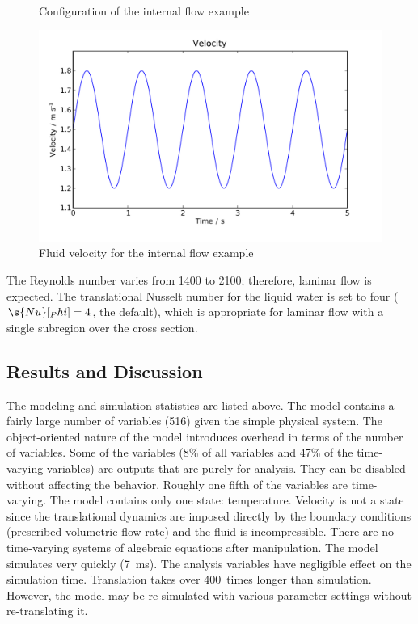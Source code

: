 \begin{figure}[htbp]
  \\
  \caption{Configuration of the internal flow example}
  \label{fig:InternalFlow}
\end{figure}

\begin{figure}[htbp]
  \includegraphics[width=\linewidth]{Results/Basic/InternalFlow/1/Velocity}%
  \caption{Fluid velocity for the internal flow example}%
  \label{fig:InternalFlowRate}
\end{figure}

The Reynolds number varies from 1400 to 2100; therefore, laminar flow is expected.  The translational Nusselt number for the liquid water is set to four ($\s{Nu}[_Phi] = 4$, the default), which is appropriate for laminar flow with a single subregion over the cross section.

\subsection{Results and Discussion}



The modeling and simulation statistics are listed above.  The model contains a fairly large number of variables (516) given the simple physical system.  The object-oriented nature of the model introduces overhead in terms of the number of variables.  Some of the variables (8\% of all variables and 47\% of the time-varying variables) are outputs that are purely for analysis.  They can be disabled without affecting the behavior.  Roughly one fifth of the variables are time-varying.  The model contains only one state: temperature.  Velocity is not a state since the translational dynamics are imposed directly by the boundary conditions (prescribed volumetric flow rate) and the fluid is incompressible.  There are no time-varying systems of algebraic equations after manipulation.  The model simulates very quickly (\SI{7}{ms}). The analysis variables have negligible effect on the simulation time.  Translation takes over 400~times longer than simulation.  However, the model may be re-simulated with various parameter settings without re-translating it.

